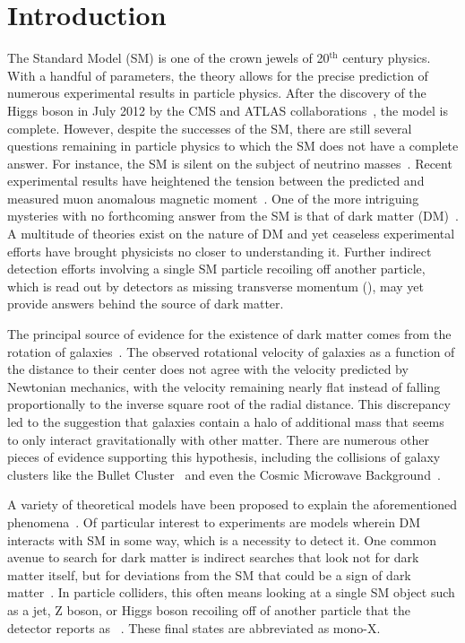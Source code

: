 \chapter{Introduction}
\label{chap:intro}
The Standard Model (SM) is one of the crown jewels of 20$^{\text{th}}$ century physics. With a handful of parameters, the theory allows for the precise prediction of numerous experimental results in particle physics. After the discovery of the Higgs boson in July 2012 by the CMS and ATLAS collaborations~\cite{atlas2012, cms2012}, the model is complete. However, despite the successes of the SM, there are still several questions remaining in particle physics to which the SM does not have a complete answer. For instance, the SM is silent on the subject of neutrino masses~\cite{Capozzi_2016}. Recent experimental results have heightened the tension between the predicted and measured muon anomalous magnetic moment~\cite{PhysRevLett.126.141801}. One of the more intriguing mysteries with no forthcoming answer from the SM is that of dark matter (DM)~\cite{Planck:2020cp,Zwicky_1933}. A multitude of theories exist on the nature of DM and yet ceaseless experimental efforts have brought physicists no closer to understanding it. Further indirect detection efforts involving a single SM particle recoiling off another particle, which is read out by detectors as missing transverse momentum (\ptmiss), may yet provide answers behind the source of dark matter.

The principal source of evidence for the existence of dark matter comes from the rotation of galaxies~\cite{Rubin_1970}. The observed rotational velocity of galaxies as a function of the distance to their center does not agree with the velocity predicted by Newtonian mechanics, with the velocity remaining nearly flat instead of falling proportionally to the inverse square root of the radial distance. This discrepancy led to the suggestion that galaxies contain a halo of additional mass that seems to only interact gravitationally with other matter. There are numerous other pieces of evidence supporting this hypothesis, including the collisions of galaxy clusters like the Bullet Cluster~\cite{Thompson_2015} and even the Cosmic Microwave Background~\cite{Planck:2020cp}.

A variety of theoretical models have been proposed to explain the aforementioned phenomena~\cite{dm2005,Arcadi_2018}. Of particular interest to experiments are models wherein DM interacts with SM in some way, which is a necessity to detect it. One common avenue to search for dark matter is indirect searches that look not for dark matter itself, but for deviations from the SM that could be a sign of dark matter~\cite{Gaskins_2016}. In particle colliders, this often means looking at a single SM object such as a jet, Z boson, or Higgs boson recoiling off of another particle that the detector reports as \ptmiss~\cite{dms2018}. These final states are abbreviated as mono-X.

